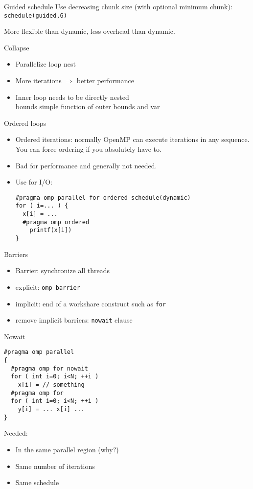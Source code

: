 \begin{numberedframe}{Guided schedule}
  Use decreasing chunk size (with optional minimum
  chunk): \texttt{schedule(guided,6)}

  More flexible than dynamic, less overhead than dynamic.    
\end{numberedframe}

\begin{numberedframe}{Collapse}
  \begin{itemize}
  \item Parallelize loop nest
  \item More iterations $\Rightarrow$ better performance
  \item Inner loop needs to be directly nested\\
    bounds simple function of outer bounds and var
  \end{itemize}
\end{numberedframe}

\begin{numberedframe}{Ordered loops}
  \begin{itemize}
  \item Ordered iterations: normally OpenMP can execute iterations in
    any sequence.
    You can force ordering if you absolutely have to.
  \item Bad for performance and generally not needed.
  \item Use for I/O:
\begin{lstlisting}
#pragma omp parallel for ordered schedule(dynamic)
for ( i=... ) {
  x[i] = ...
  #pragma omp ordered
    printf(x[i])
}
\end{lstlisting}
  \end{itemize}
\end{numberedframe}

\begin{numberedframe}{Barriers}
  \begin{itemize}
  \item Barrier: synchronize all threads
  \item explicit: \lstinline{omp barrier}
  \item implicit: end of a workshare construct such as \lstinline{for}
  \item remove implicit barriers: \lstinline{nowait} clause
  \end{itemize}
\end{numberedframe}

\begin{numberedframe}{Nowait}
\begin{lstlisting}
#pragma omp parallel
{
  #pragma omp for nowait
  for ( int i=0; i<N; ++i )
    x[i] = // something
  #pragma omp for
  for ( int i=0; i<N; ++i )
    y[i] = ... x[i] ...
}
\end{lstlisting}
Needed:
  \begin{itemize}
  \item In the same parallel region (why?)
  \item Same number of iterations
  \item Same schedule
  \end{itemize}
\end{numberedframe}

